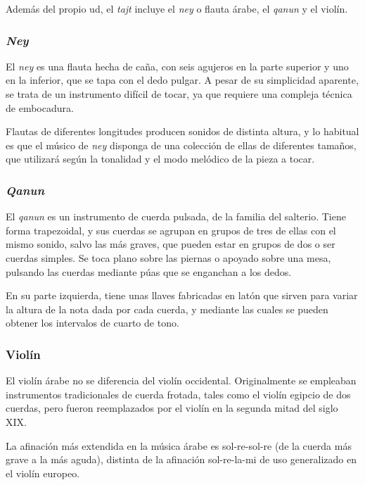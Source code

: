     Además del propio ud, el \emph{tajt} incluye el \emph{ney} o flauta árabe, el \emph{qanun} y el violín.

    \subsubsection{\emph{Ney}}

    El \emph{ney} es una flauta hecha de caña, con seis agujeros en la parte superior y uno en la inferior, que se tapa con el dedo pulgar. A pesar de su simplicidad aparente, se trata de un instrumento difícil de tocar, ya que requiere una compleja técnica de embocadura.

    Flautas de diferentes longitudes producen sonidos de distinta altura, y lo habitual es que el músico de \emph{ney} disponga de una colección de ellas de diferentes tamaños, que utilizará según la tonalidad  y el modo melódico de la pieza a tocar.

    \subsubsection{\emph{Qanun}}

    El \emph{qanun} es un instrumento de cuerda pulsada, de la familia del salterio. Tiene forma trapezoidal, y sus cuerdas se agrupan en grupos de tres de ellas con el mismo sonido, salvo las más graves, que pueden estar en grupos de dos o ser cuerdas simples. Se toca plano sobre las piernas o apoyado sobre una mesa, pulsando las cuerdas mediante púas que se enganchan a los dedos.

    En su parte izquierda, tiene unas llaves fabricadas en latón que sirven para variar la altura de la nota dada por cada cuerda, y mediante las cuales se pueden obtener los intervalos de cuarto de tono.

    \subsubsection{Violín}

    El violín árabe no se diferencia del violín occidental. Originalmente se empleaban instrumentos tradicionales de cuerda frotada, tales como el violín egipcio de dos cuerdas, pero fueron reemplazados por el violín en la segunda mitad del siglo \textsc{XIX}.

    La afinación más extendida en la música árabe es sol-re-sol-re (de la cuerda más grave a la más aguda), distinta de la afinación sol-re-la-mi de uso generalizado en el violín europeo.

